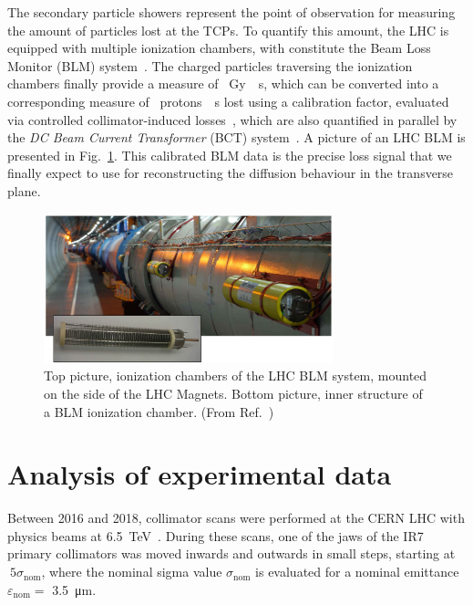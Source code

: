 The secondary particle showers represent the point of observation for measuring the amount of particles lost at the TCPs. To quantify this amount, the LHC is equipped with multiple ionization chambers, with constitute the Beam Loss Monitor (BLM) system~\cite{blmSystem1, blmSystem2}. The charged particles traversing the ionization chambers finally provide a measure of \SI{}{Gy \per s}, which can be converted into a corresponding measure of \SI{}{protons \per s} lost using a calibration factor, evaluated via controlled collimator-induced losses~\cite{arek}, which are also quantified in parallel by the \textit{DC Beam Current Transformer} (BCT) system~\cite{Denard:1213275}. A picture of an LHC BLM is presented in Fig.~\ref{fig:blm}. This calibrated BLM data is the precise loss signal that we finally expect to use for reconstructing the diffusion behaviour in the transverse plane.

\begin{figure}[htp]
    \centering
    \includegraphics[width=0.75\textwidth]{5_Diffusion_measurement_LHC/figs/blm.png}
    \caption{Top picture, ionization chambers of the LHC BLM system, mounted on the side of the LHC Magnets. Bottom picture, inner structure of a BLM ionization chamber. (From Ref.~\cite{blmonline})}
    \label{fig:blm}
\end{figure}


%
\section{Analysis of experimental data}
%

Between 2016 and 2018, collimator scans were performed at the CERN LHC with physics beams at \SI{6.5}{TeV}~\cite{PhysRevAccelBeams.23.044802}. During these scans, one of the jaws of the IR7 primary collimators was moved inwards and outwards in small steps, starting at $~5\sigma_\text{nom}$, where the nominal sigma value $\sigma_\text{nom}$ is evaluated for a nominal emittance $\varepsilon_\text{nom} =$ \SI{3.5}{\micro\meter}.

